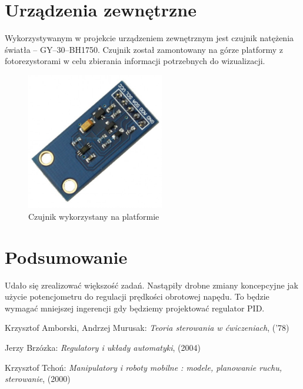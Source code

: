 \documentclass[10pt, a4paper]{article}
\begin{document}
\section{Urządzenia zewnętrzne}
Wykorzystywanym w projekcie urządzeniem zewnętrznym jest czujnik natężenia światła -- GY--30--BH1750. Czujnik został zamontowany na górze platformy z fotorezystorami w celu zbierania informacji potrzebnych do wizualizacji.
\begin{figure}[H]
\centering
\includegraphics[width=6cm]{figures/gy.png}
\caption{Czujnik wykorzystany na platformie}
\end{figure}


\section{Podsumowanie}

Udało się zrealizować większość zadań. Nastąpiły drobne zmiany koncepcyjne jak użycie potencjometru do regulacji prędkości obrotowej napędu. To będzie wymagać mniejszej ingerencji gdy będziemy projektować regulator PID.

\newpage
{}

\begin{thebibliography}{9}
	 Krzysztof Amborski, Andrzej Murusak:
	\emph{Teoria sterowania w ćwiczeniach}, ('78)
	
	 Jerzy Brzózka:
	\emph{Regulatory i układy automatyki}, (2004)
	
	 Krzysztof Tchoń:
	\emph{Manipulatory i roboty mobilne : modele, planowanie ruchu, sterowanie}, (2000)
	
\end{thebibliography}
\end{document}
